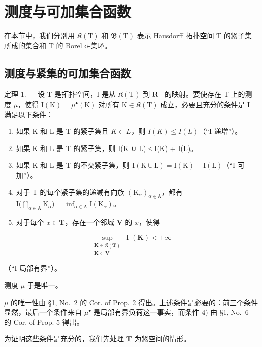 \section{测度与可加集合函数}

在本节中，我们分别用 \(\mathfrak{K}(\mathrm{T})\) 和 \(\mathfrak{B}(\mathrm{T})\) 表示 Hausdorff 拓扑空间 \(\mathrm{T}\) 的紧子集所成的集合和 \(\mathrm{T}\) 的 Borel σ-集环。

\subsection{测度与紧集的可加集合函数}

定理 1. --- 设 T 是拓扑空间，I 是从 \(\mathfrak{K}(\mathrm{T})\) 到 \(\mathbf{R}_{+}\) 的映射。要使存在 T 上的测度 \(\mu\)，使得 \(\mathrm{I}(\mathrm{K}) = \mu^{\bullet}(\mathrm{K})\) 对所有 \(\mathrm{K} \in \mathfrak{K}(\mathrm{T})\) 成立，必要且充分的条件是 I 满足以下条件：

\begin{enumerate}
\def\labelenumi{\arabic{enumi})}
\item
  如果 K 和 L 是 T 的紧子集且 \(K \subset L\)，则 \(I(K) \leqslant I(L)\)（“I 递增”）。
\item
  如果 K 和 L 是 T 的紧子集，则 I(K ∪ L) ≤ I(K) + I(L)。
\item
  如果 K 和 L 是 T 的不交紧子集，则 \(\mathrm{I}(\mathrm{K}\cup\mathrm{L})=\mathrm{I}(\mathrm{K})+\mathrm{I}(\mathrm{L})\)（“I 可加”）。
\item
  对于 T 的每个紧子集的递减有向族 \((\mathrm{K}_{\alpha})_{\alpha \in \mathrm{A}}\)，都有 \(\mathrm{I}\big(\bigcap_{\alpha \in \mathrm{A}}\mathrm{K}_{\alpha}\big) = \inf_{\alpha \in \mathrm{A}}\mathrm{I}(\mathrm{K}_{\alpha})\)。
\item
  对于每个 \(x \in \mathbf{T}\)，存在一个邻域 \(\mathbf{V}\) 的 \(x\)，使得
\end{enumerate}

\[
\sup_{\substack{\mathbf{K}\in \mathfrak{K}(\mathbf{T})\\ \mathbf{K}\subset \mathbf{V}}}\operatorname{I}(\mathbf{K}) <   + \infty
\]

（“I 局部有界”）。

测度 \(\mu\) 于是唯一。

\(\mu\) 的唯一性由 §1, No.~2 的 Cor. of Prop. 2 得出。上述条件是必要的：前三个条件显然，最后一个条件来自 \(\mu^{\bullet}\) 是局部有界负荷这一事实，而条件 4) 由 §1, No.~6 的 Cor. of Prop. 5 得出。

为证明这些条件是充分的，我们先处理 \(\mathbf{T}\) 为紧空间的情形。

